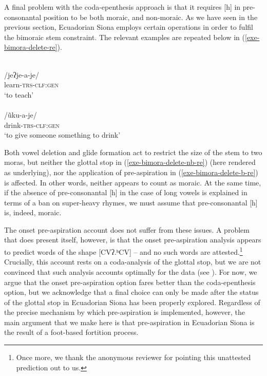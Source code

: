 \documentclass[output=paper]{langscibook}
\begin{document}
A final problem with the coda-epenthesis approach is that it requires [h] in pre-consonantal position to be both moraic, and non-moraic. As we have seen in the previous section, Ecuadorian Siona employs certain operations in order to fulfil the bimoraic stem constraint. The relevant examples are repeated below in (\ref{exe-bimora-delete-re}).

\begin{exe}
\ex\label{exe-bimora-delete-re}
\begin{xlist}
\begin{multicols}{2}
\ex\label{exe-bimora-delete-nb-re}
\glll [jeʔ.ja.je]\\
/jeʔje-a-je/ \\
learn-\textsc{trs-clf:gen}\\
\trans `to teach'\\
{\citep[112]{Bruil:2014}}
\ex\label{exe-bimora-delete-b-re}
\glll [õh.kʷa.je]\\
/ũku-a-je/\\
drink-\textsc{trs-clf:gen}\\
\trans `to give someone something to drink'\\
{\citep[120]{Bruil:2014}}
\end{multicols}
\end{xlist}
\end{exe}

Both vowel deletion and glide formation act to restrict the size of the stem to two moras, but neither the glottal stop in (\ref{exe-bimora-delete-nb-re}) (here rendered as underlying), nor the application of pre-aspiration in (\ref{exe-bimora-delete-b-re}) is affected. In other words, neither appears to count as moraic. At the same time, if the absence of pre-consonantal [h] in the case of long vowels is explained in terms of a ban on super-heavy rhymes, we must assume that pre-consonantal [h] is, indeed, moraic.

The onset pre-aspiration account does not suffer from these issues. A problem that does present itself, however, is that the onset pre-aspiration analysis appears to predict words of the shape [CVʔ.ʰCV] -- and no such words are attested.\footnote{Once more, we thank the anonymous reviewer for pointing this unattested prediction out to us.} Crucially, this account rests on a coda-analysis of the glottal stop, but we are not convinced that such analysis accounts optimally for the data (see ). For now, we argue that the onset pre-aspiration option fares  better than the coda-epenthesis option, but we acknowledge that a final choice can only be made after the status of the glottal stop in Ecuadorian Siona has been properly explored. Regardless of the precise mechanism by which pre-aspiration is implemented, however, the main argument that we make here is that pre-aspiration in Ecuadorian Siona is the result of a foot-based fortition process.
\end{document}
